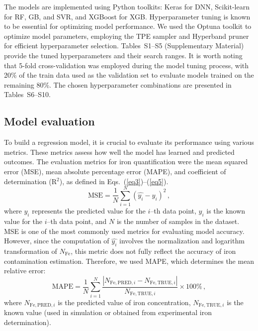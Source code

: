 \documentclass[a4paper,fleqn]{cas-sc}
\begin{document}
The models are implemented using Python toolkits: Keras for DNN, Scikit-learn for RF, GB, and SVR, and XGBoost for XGB.
Hyperparameter tuning is known \cite{Hanif2024} to be essential for optimizing model performance.
We used the Optuna toolkit to optimize model parameters, employing the TPE sampler and Hyperband pruner for efficient hyperparameter selection.
Tables~S1--S5 (Supplementary Material) provide the tuned hyperparameters and their search ranges.
It is worth noting that 5-fold cross-validation was employed during the model tuning process,
with 20\% of the train data used as the validation set to evaluate models trained on the remaining 80\%.
The chosen hyperparameter combinations are presented in Tables~S6--S10.


\subsection{Model evaluation}

To build a regression model, it is crucial to evaluate its performance using various metrics.
These metrics assess how well the model has learned and predicted outcomes.
The evaluation metrics for iron quantification were the mean squared error (MSE),
mean absolute percentage error (MAPE),
and coefficient of determination (R$^2$), as defined in Eqs.~(\ref{eq3})–(\ref{eq5}).
\begin{equation}
\label{eq3}
    \mathrm{MSE} = \frac{1}{N}\displaystyle\sum_{i=1}^{N} (\hat{y_i}-y_i)^2\,,
\end{equation}
where $\hat{y_i}$ represents the predicted value for the $i$--th data point,
$y_i$ is the known value for the $i$--th data point,
and $N$ is the number of samples in the dataset.
MSE is one of the most commonly used metrics for evaluating model accuracy.
However, since the computation of $\hat{y_i}$ involves the normalization and logarithm transformation of $N_\mathrm{Fe}$,
this metric does not fully reflect the accuracy of iron contamination estimation.
Therefore, we used MAPE, which determines the mean relative error:
\begin{equation}
\label{eq4}
    \mathrm{MAPE} = \frac{1}{N}\displaystyle\sum_{i=1}^{N} \frac{|N_{\mathrm{Fe,PRED},i}-N_{\mathrm{Fe,TRUE},i}|}{N_{\mathrm{Fe,TRUE},i}}\times 100 \%\,,
\end{equation}
where $N_{\mathrm{Fe,PRED},i}$ is the predicted value of iron concentration,
$N_{\mathrm{Fe,TRUE},i}$ is the known value (used in simulation or obtained from experimental iron determination).
\end{document}

